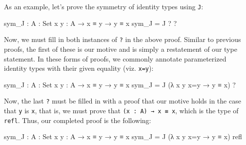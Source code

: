 \documentclass[12pt]{article}
\begin{document}
As an example, let's prove the symmetry of identity types using {\tt J}:
\begin{center}
\begin{minipage}{0.9\textwidth}
\begin{code}
sym_J : {A : Set} {x y : A} → x ≡ y → y ≡ x
sym_J = J ? ?
\end{code}
\end{minipage}
\end{center}
Now, we must fill in both instances of {\tt ?} in the above proof. Similar to
previous proofs, the first of these is our motive and is simply a restatement of
our type statement. In these forms of proofs, we commonly annotate parameterized
identity types with their given equality (viz. {\tt x=y}):
\begin{center}
\begin{minipage}{0.9\textwidth}
\begin{code}
sym_J : {A : Set} {x y : A} → x ≡ y → y ≡ x
sym_J = J (λ {x y} x=y → y ≡ x) ?
\end{code}
\end{minipage}
\end{center}
Now, the last {\tt ?} must be filled in with a proof that our motive holds in
the case that {\tt y} is {\tt x}, that is, we must prove that
{\tt (x : A) → x ≡ x}, which is the type of {\tt refl}. Thus, our completed
proof is the following:
\begin{center}
\begin{minipage}{0.9\textwidth}
\begin{code}
sym_J : {A : Set} {x y : A} → x ≡ y → y ≡ x
sym_J = J (λ {x y} x=y → y ≡ x) refl
\end{code}
\end{minipage}
\end{center}



\end{document}
